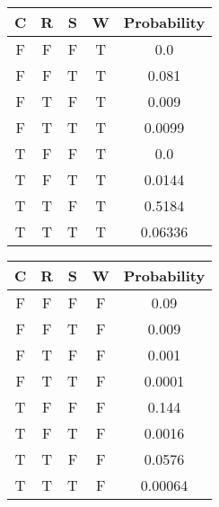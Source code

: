 \begin{table}[!h]
	\begin{minipage}{0.5\textwidth}
		\centering
		\begin{tabular}{c|c|c|c|c}
			C & R & S & W & Probability \\\hline
			F & F & F & T & 0.0         \\
			F & F & T & T & 0.081       \\
			F & T & F & T & 0.009       \\
			F & T & T & T & 0.0099      \\
			T & F & F & T & 0.0         \\
			T & F & T & T & 0.0144      \\
			T & T & F & T & 0.5184      \\
			T & T & T & T & 0.06336     \\
		\end{tabular}	
	\end{minipage}
	\begin{minipage}{0.5\textwidth}
		\centering
		\begin{tabular}{c|c|c|c|c}
			C & R & S & W & Probability \\\hline												
			F & F & F & F & 0.09        \\
			F & F & T & F & 0.009       \\
			F & T & F & F & 0.001       \\
			F & T & T & F & 0.0001      \\
			T & F & F & F & 0.144       \\
			T & F & T & F & 0.0016      \\
			T & T & F & F & 0.0576      \\
			T & T & T & F & 0.00064     \\
		\end{tabular}	
	\end{minipage}
	\label{tab:joint}
\end{table}

